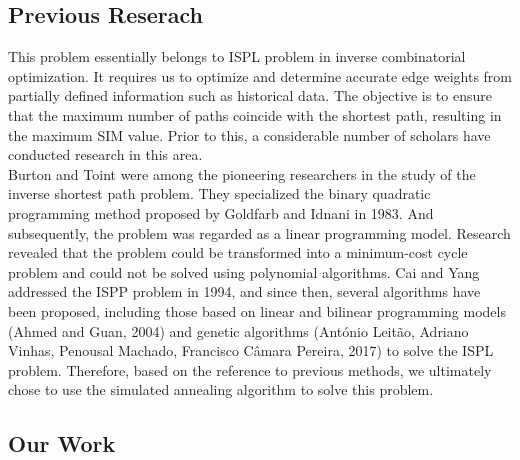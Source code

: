 \subsection{Previous Reserach}%

\indent\indent This problem essentially belongs to ISPL problem in inverse combinatorial optimization. It requires us to optimize and determine accurate edge weights from partially defined information such as historical data. The objective is to ensure that the maximum number of paths coincide with the shortest path, resulting in the maximum SIM value. Prior to this, a considerable number of scholars have conducted research in this area. \\
\indent Burton and Toint were among the pioneering researchers in the study of the inverse shortest path problem. They specialized the binary quadratic programming method proposed by Goldfarb and Idnani in 1983. And subsequently, the problem was regarded as a linear programming model. Research revealed that the problem could be transformed into a minimum-cost cycle problem and could not be solved using polynomial algorithms. Cai and Yang addressed the ISPP problem in 1994, and since then, several algorithms have been proposed, including those based on linear and bilinear programming models (Ahmed and Guan, 2004) and genetic algorithms (António Leitão, Adriano Vinhas, Penousal Machado, Francisco Câmara Pereira, 2017) to solve the ISPL problem. Therefore, based on the reference to previous methods, we ultimately chose to use the simulated annealing algorithm to solve this problem. 

\subsection{Our Work}%

